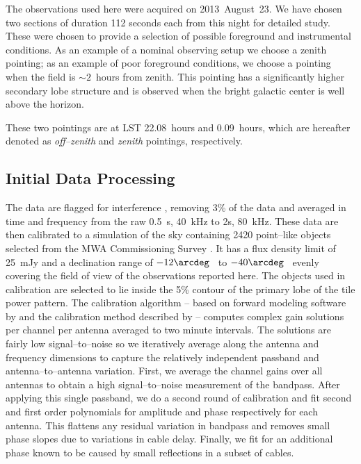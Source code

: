 \documentclass[preprint2,iop,numberedappendix,twocolappendix,appendixfloats]{emulateapj}
\begin{document}
The observations used here were acquired on 2013~August~23. We have chosen two sections of duration 112 seconds each from this night for detailed study. These were chosen to provide a selection of possible foreground and instrumental conditions. As an example of a nominal observing setup we choose a zenith pointing; as an example of poor foreground conditions, we choose a pointing when the field is $\sim 2$~hours from zenith. This pointing has a significantly higher secondary lobe structure and is observed when the bright galactic center is well above the horizon. 

These two pointings are at LST 22.08~hours and 0.09~hours, which are hereafter denoted as {\it off--zenith} and {\it zenith} pointings, respectively. 

\subsection{Initial Data Processing}\label{sec:data-analysis}

The data are flagged for interference \citep{off15}, removing 3\% of the data and averaged in time  and frequency from the raw 0.5~s, 40~kHz to 2s, 80~kHz. These data are then calibrated to a simulation of the sky containing 2420 point--like objects selected from the MWA Commissioning Survey \citep[MWACS;][]{hur14}. It has a flux density limit of 25~mJy and a declination range of $-12\arcdeg$~ to $-40\arcdeg$~ evenly covering the field of view of the observations reported here. The objects used in calibration are selected to lie inside the 5\% contour of the primary lobe of the tile power pattern. The calibration algorithm -- based on forward modeling software by \citet{sul12} and the calibration method described by \citet{sal14} -- computes complex gain solutions per channel per antenna averaged to two minute intervals. The solutions are fairly low signal--to--noise so we iteratively average along the antenna and frequency dimensions to capture the relatively independent passband and antenna--to--antenna variation. First, we average the channel gains over all antennas to obtain a high signal--to--noise measurement of the bandpass. After applying this single passband, we do a second round of calibration and fit second and first order polynomials for amplitude and phase respectively for each antenna. This flattens any residual variation in bandpass and removes small phase slopes due to variations in cable delay. Finally, we fit for an additional phase known to be caused by small reflections in a subset of cables. 
\end{document}
